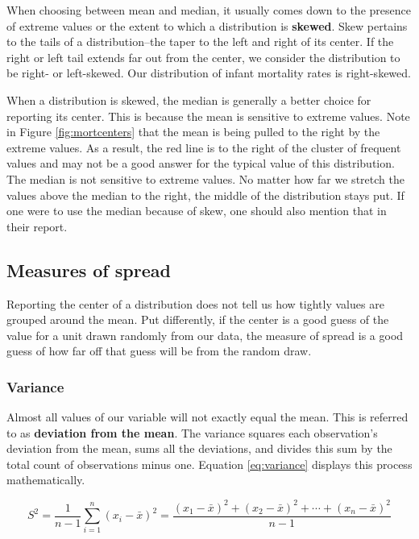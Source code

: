 \documentclass[
]{book}
\begin{document}
When choosing between mean and median, it usually comes down to the presence of extreme values or the extent to which a distribution is \textbf{skewed}. Skew pertains to the tails of a distribution--the taper to the left and right of its center. If the right or left tail extends far out from the center, we consider the distribution to be right- or left-skewed. Our distribution of infant mortality rates is right-skewed.

When a distribution is skewed, the median is generally a better choice for reporting its center. This is because the mean is sensitive to extreme values. Note in Figure \ref{fig:mortcenters} that the mean is being pulled to the right by the extreme values. As a result, the red line is to the right of the cluster of frequent values and may not be a good answer for the typical value of this distribution. The median is not sensitive to extreme values. No matter how far we stretch the values above the median to the right, the middle of the distribution stays put. If one were to use the median because of skew, one should also mention that in their report.

\hypertarget{measures-of-spread}{%
\subsection{Measures of spread}\label{measures-of-spread}}

Reporting the center of a distribution does not tell us how tightly values are grouped around the mean. Put differently, if the center is a good guess of the value for a unit drawn randomly from our data, the measure of spread is a good guess of how far off that guess will be from the random draw.

\hypertarget{variance}{%
\subsubsection*{Variance}\label{variance}}

Almost all values of our variable will not exactly equal the mean. This is referred to as \textbf{deviation from the mean}. The variance squares each observation's deviation from the mean, sums all the deviations, and divides this sum by the total count of observations minus one. Equation \eqref{eq:variance} displays this process mathematically.

\begin{equation}
{\displaystyle S^2={\frac {1}{n-1}}\sum _{i=1}^{n}(x_{i}-\bar{x})^2={\frac {(x_{1}-\bar{x})^2+(x_{2}-\bar{x})^2+\cdots +(x_{n}-\bar{x})^2}{n-1}}}
\label{eq:variance}
\end{equation}
\end{document}
